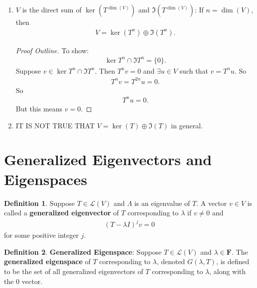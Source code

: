 \documentclass{book}
\theoremstyle{definition}
\newtheorem{defn}{Definition}[section]
\newcommand{\lag}{\mathcal{L}}
\begin{document}
\begin{enumerate}
	\begin{proof}[Proof Outline]
		To show:
		\begin{align*}
		\ker T^n = \ker T^{n+1}.
		\end{align*}
		Suppose this is not true. Then the dimension of the kernel has to increase by at least 1 every step until $n+1$. Thus $\dim \ker T^{n+1} \geq n+1 > n = \dim(V)$. This is a contradiction. 
	\end{proof}
	\item $V$ is the direct sum of $\ker(T^{\dim(V)})$ and $\Im(T^{\dim(V)})$: If $n = \dim(V)$, then
	\begin{align*}
	V = \ker(T^n) \oplus \Im(T^n).
	\end{align*}
	\begin{proof}[Proof Outline]
		To show:
		\begin{align*}
		\ker T^n \cap \Im T^n = \{0 \}. 
		\end{align*}
		Suppose $v\in \ker T^n \cap \Im T^n$. Then $T^n v = 0$ and $\exists u\in V$ such that $v = T^n u$. So
		\begin{align*}
		T^n v = T^{2n}u = 0.
		\end{align*}
		So
		\begin{align*}
		T^n u = 0.
		\end{align*}
		But this means $v = 0$. 
	\end{proof}
	\item IT IS NOT TRUE THAT $V = \ker(T) \oplus \Im(T)$ in general. 
\end{enumerate}

\section{Generalized Eigenvectors and Eigenspaces}
\begin{defn}
	Suppose $T\in \lag(V)$ and $\Lambda$ is an eigenvalue of $T$. A vector $v\in V$ is called a \textbf{generalized eigenvector} of $T$ corresponding to $\lambda$ if $v\neq 0$ and
	\begin{align*}
	(T-\lambda I)^j v = 0
	\end{align*}
	for some positive integer $j$. 
\end{defn}

\begin{defn}
	\textbf{Generalized Eigenspace}: Suppose $T \in \lag(V)$ and $\lambda \in \mathbf{F}$. The \textbf{generalized eigenspace} of $T$ corresponding to $\lambda$, denoted $G(\lambda,T)$, is defined to be the set of all generalized eigenvectors of $T$ corresponding to $\lambda$, along with the 0 vector.
\end{defn}
\end{document}
